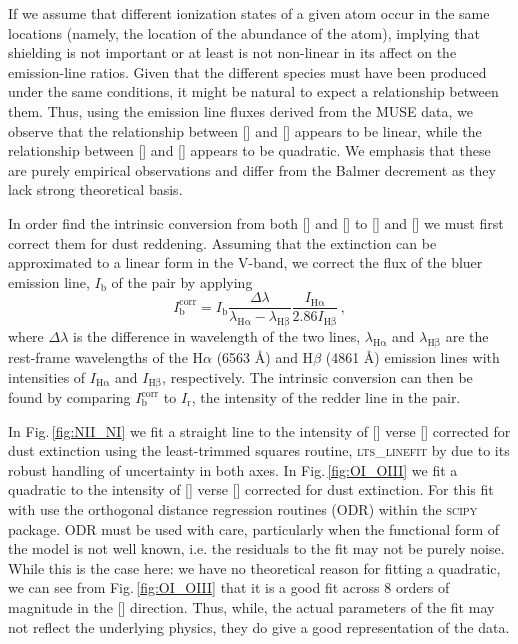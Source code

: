 		If we assume that different ionization states of a given atom occur in the same locations (namely, the location of the abundance of the atom), implying that shielding is not important or at least is not non-linear in its affect on the emission-line ratios. Given that the different species must have been produced under the same conditions, it might be natural to expect a relationship between them. Thus, using the emission line fluxes derived from the MUSE data, we observe that the relationship between [] and [] appears to be linear, while the relationship between [] and [] appears to be quadratic. We emphasis that these are purely empirical observations and differ from the Balmer decrement as they lack strong theoretical basis. 

		In order find the intrinsic conversion from both [] and [] to [] and [] we must first correct them for dust reddening. Assuming that the extinction can be approximated to a linear form in the V-band, we correct the flux of the bluer emission line, $I_\mathrm{b}$ of the pair by applying
		\begin{equation}
			I^\mathrm{corr}_\mathrm{b} = I_\mathrm{b} \frac{\Delta\lambda}{\lambda_\mathrm{H\alpha} - \lambda_\mathrm{H\beta}} \frac{I_\mathrm{H\alpha}}{2.86 I_\mathrm{H\beta}} \, ,
		\end{equation}
		where $\Delta\lambda$ is the difference in wavelength of the two lines, $\lambda_\mathrm{H\alpha}$ and $\lambda_\mathrm{H\beta}$ are the rest-frame wavelengths of the H$\alpha$ (6563 \AA) and H$\beta$ (4861 \AA) emission lines with intensities of $I_\mathrm{H\alpha}$ and $I_\mathrm{H\beta}$, respectively. The intrinsic conversion can then be found by comparing $I^\mathrm{corr}_\mathrm{b}$ to $I_\mathrm{r}$, the intensity of the redder line in the pair. 

		In Fig.\,\ref{fig:NII_NI} we fit a straight line to the intensity of [] verse [] corrected for dust extinction using the least-trimmed squares routine, \textsc{lts\_linefit} by \citet{Cappellari2013} due to its robust handling of uncertainty in both axes. In Fig.\,\ref{fig:OI_OIII} we fit a quadratic to the intensity of [] verse [] corrected for dust extinction. For this fit with use the orthogonal distance regression routines (ODR) within the \textsc{scipy} package. ODR must be used with care, particularly when the functional form of the model is not well known, i.e. the residuals to the fit may not be purely noise. While this is the case here: we have no theoretical reason for fitting a quadratic, we can see from Fig.\,\ref{fig:OI_OIII} that it is a good fit across 8 orders of magnitude in the [] direction. Thus, while, the actual parameters of the fit may not reflect the underlying physics, they do give a good representation of the data.


